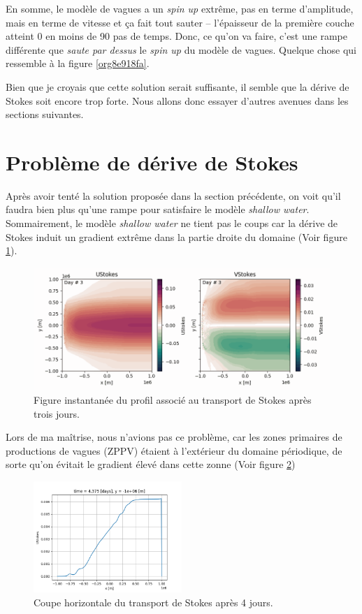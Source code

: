\documentclass[10pt]{article}
\numberwithin{equation}{section}
\begin{document}
En somme, le modèle de vagues a un \emph{spin up} extrême, pas en terme d'amplitude, mais en terme de vitesse et ça fait tout sauter -- l'épaisseur de la première couche atteint 0 en moins de 90 pas de temps.
Donc, ce qu'on va faire, c'est une rampe différente que \emph{saute par dessus} le \emph{spin up} du modèle de vagues.
Quelque chose qui ressemble à la figure \ref{org8e918fa}. \bigskip

Bien que je croyais que cette solution serait suffisante, il semble que la dérive de Stokes soit encore trop forte.
Nous allons donc essayer d'autres avenues dans les sections suivantes. 

\section{Problème de dérive de Stokes}
\label{sec:org9cf141a}
Après avoir tenté la solution proposée dans la section précédente, on voit qu'il faudra bien plus qu'une rampe pour satisfaire le modèle \emph{shallow water}.
Sommairement, le modèle \emph{shallow water} ne tient pas le coups car la dérive de Stokes induit un gradient extrême dans la partie droite du domaine (Voir figure \ref{fig:org3c697ee}).

\begin{figure}[htbp]
\centering
\includegraphics[width=.9\linewidth]{figures/debuggage/2023_10_13_UStokes.png}
\caption{\label{fig:org3c697ee}Figure instantanée du profil associé au transport de Stokes après trois jours.}
\end{figure}

Lors de ma maîtrise, nous n'avions pas ce problème, car les zones primaires de productions de vagues (ZPPV) étaient à l'extérieur du domaine périodique, de sorte qu'on évitait le gradient élevé dans cette zonne (Voir figure \ref{fig:orgdaa9ef5})

\begin{figure}[!htpb]
\centering
\includegraphics[width=0.5\textwidth]{figures/debuggage/2023_10_13_Stokes_coupe.png}
\caption{\label{fig:orgdaa9ef5}Coupe horizontale du transport de Stokes après 4 jours.}
\end{figure}
\end{document}
